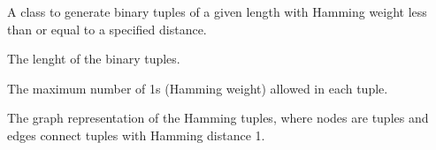 \documentclass[letterpaper,10pt,english]{sphinxmanual}
\begin{document}
\begin{fulllineitems}
\label{\detokenize{index:hammindist.functions.HammingTupla}}
\pysigstartsignatures
\pysiglinewithargsret
{}
{\sphinxparamcomma {}}
{}
\pysigstopsignatures
\sphinxAtStartPar
A class to generate binary tuples of a given length with Hamming weight
less than or equal to a specified distance.

\begin{fulllineitems}
\label{\detokenize{index:hammindist.functions.HammingTupla.lenght}}
\pysigstartsignatures
\pysiglinewithargsret
{}
{}
{}
\pysigstopsignatures
\sphinxAtStartPar
The lenght of the binary tuples.

\end{fulllineitems}


\begin{fulllineitems}
\label{\detokenize{index:hammindist.functions.HammingTupla.distance}}
\pysigstartsignatures
\pysiglinewithargsret
{}
{}
{}
\pysigstopsignatures
\sphinxAtStartPar
The maximum number of 1s (Hamming weight) allowed in each tuple.

\end{fulllineitems}


\begin{fulllineitems}
\label{\detokenize{index:hammindist.functions.HammingTupla.graph}}
\pysigstartsignatures
\pysiglinewithargsret
{}
{}
{}
\pysigstopsignatures
\sphinxAtStartPar
The graph representation of the Hamming tuples, where nodes are tuples
and edges connect tuples with Hamming distance 1.

\end{fulllineitems}


\end{fulllineitems}
\end{document}
